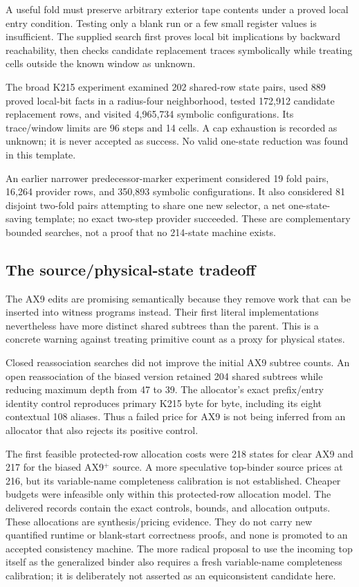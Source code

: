 \documentclass[11pt]{article}
\begin{document}
A useful fold must preserve arbitrary exterior tape contents under a proved local entry condition. Testing only a blank run or a few small register values is insufficient. The supplied search first proves local bit implications by backward reachability, then checks candidate replacement traces symbolically while treating cells outside the known window as unknown.

The broad K215 experiment examined 202 shared-row state pairs, used 889 proved local-bit facts in a radius-four neighborhood, tested 172,912 candidate replacement rows, and visited 4,965,734 symbolic configurations. Its trace/window limits are 96 steps and 14 cells. A cap exhaustion is recorded as unknown; it is never accepted as success. No valid one-state reduction was found in this template.

An earlier narrower predecessor-marker experiment considered 19 fold pairs, 16,264 provider rows, and 350,893 symbolic configurations. It also considered 81 disjoint two-fold pairs attempting to share one new selector, a net one-state-saving template; no exact two-step provider succeeded. These are complementary bounded searches, not a proof that no 214-state machine exists.

\subsection{The source/physical-state tradeoff}

The AX9 edits are promising semantically because they remove work that can be inserted into witness programs instead. Their first literal implementations nevertheless have more distinct shared subtrees than the parent. This is a concrete warning against treating primitive count as a proxy for physical states.

Closed reassociation searches did not improve the initial AX9 subtree counts. An open reassociation of the biased version retained 204 shared subtrees while reducing maximum depth from 47 to 39. The allocator's exact prefix/entry identity control reproduces primary K215 byte for byte, including its eight contextual 108 aliases. Thus a failed price for AX9 is not being inferred from an allocator that also rejects its positive control.

The first feasible protected-row allocation costs were 218 states for clear AX9 and 217 for the biased AX9$^+$ source. A more speculative top-binder source prices at 216, but its variable-name completeness calibration is not established. Cheaper budgets were infeasible only within this protected-row allocation model. The delivered records contain the exact controls, bounds, and allocation outputs. These allocations are synthesis/pricing evidence. They do not carry new quantified runtime or blank-start correctness proofs, and none is promoted to an accepted consistency machine. The more radical proposal to use the incoming top itself as the generalized binder also requires a fresh variable-name completeness calibration; it is deliberately not asserted as an equiconsistent candidate here.
\end{document}
